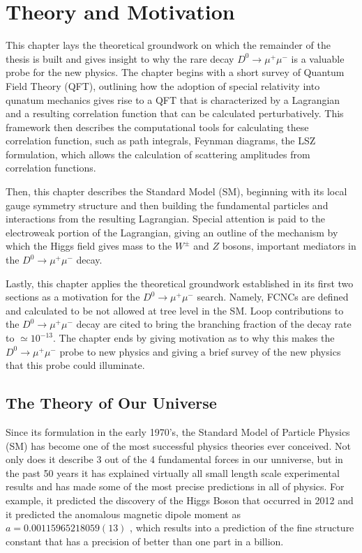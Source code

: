 \chapter{Theory and Motivation}
\label{ch:2}

This chapter lays the theoretical groundwork on which the remainder of the thesis is built and gives insight to why the rare decay $D^0 \to \mu^+ \mu^-$ is a valuable probe for the new physics. The chapter begins with a short survey of Quantum Field Theory (QFT), outlining how the adoption of special relativity into qunatum mechanics gives rise to a QFT that is characterized by a Lagrangian and a resulting correlation function that can be calculated perturbatively. This framework then describes the computational tools for calculating these correlation function, such as path integrals, Feynman diagrams, the LSZ formulation, which allows the calculation of scattering amplitudes from correlation functions. 

Then, this chapter describes the Standard Model (SM), beginning with its local gauge symmetry structure and then building the fundamental particles and interactions from the resulting Lagrangian. Special attention is paid to the electroweak portion of the Lagrangian, giving an outline of the mechanism by which the Higgs field gives mass to the $W^\pm$ and $Z$ bosons, important mediators in the $D^0 \to \mu^+ \mu^-$ decay. 

Lastly, this chapter applies the theoretical groundwork established in its first two sections as a motivation for the $D^0 \to \mu^+ \mu^-$ search. Namely, FCNCs are defined and calculated to be not allowed at tree level in the SM. Loop contributions to the $D^0 \to \mu^+ \mu^-$ decay are cited to bring the branching fraction of the decay rate to $\simeq 10^{-13}$. The chapter ends by giving motivation as to why this makes the $D^0 \to \mu^+ \mu^-$ probe to new physics and giving a brief survey of the new physics that this probe could illuminate. 

\section{The Theory of Our Universe}

Since its formulation in the early 1970's, the Standard Model of Particle Physics (SM) has become one of the most successful physics theories ever conceived. Not only does it describe 3 out of the 4 fundamental forces in our unniverse, but in the past 50 years it has explained virtually all small length scale experimental results and has made some of the most precise predictions in all of physics. For example, it predicted the discovery of the Higgs Boson that occurred in 2012 \cite{ref:cms2012observation}\cite{ref:atlas2012observation} and it predicted the anomalous magnetic dipole moment as $a = 0.00115965218059(13)$ \cite{ref:fan_2023}, which results into a prediction of the fine structure constant that has a precision of better than one part in a billion.


